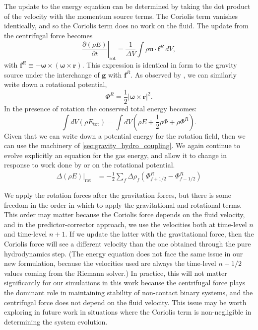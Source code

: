 \documentclass[iop]{../emulateapj}
\begin{document}
The update to the energy equation can be determined by taking the dot product of the velocity
with the momentum source terms. The Coriolis term vanishes identically, and so
the Coriolis term does no work on the fluid. The update from the centrifugal force becomes
\begin{equation}
  \left.\frac{\partial(\rho E)}{\partial t}\right|_{\text{rot}} = \frac{1}{\Delta V}\int \rho \mathbf{u} \cdot \mathbf{f}^R\, dV,
\end{equation}
with $\mathbf{f}^R \equiv  -{\bm\omega} \times \left({\bm\omega} \times \mathbf{r}\right)$. 
This expression is identical in form to the gravity source under the interchange of $\mathbf{g}$ with $\mathbf{f}^R$.
As observed by \cite{marcello:2012}, we can similarly write down a rotational potential,
\begin{equation}
  \Phi^R = \frac{1}{2} \left| {\bm\omega} \times \mathbf{r} \right|^2.
\end{equation}
In the presence of rotation the conserved total energy becomes:
\begin{equation}
  \int dV (\rho E_{\text{tot}}) = \int dV \left( \rho E + \frac{1}{2} \rho \Phi + \rho \Phi^R \right).
\end{equation}
Given that we can write down a potential energy for the rotation field, then we can use the machinery of 
\autoref{sec:gravity_hydro_coupling}. We again continue to evolve explicitly an equation for 
the gas energy, and allow it to change in response to work done by or on the rotational potential.
\begin{align}
  \left.\Delta(\rho E)\right|_{\text{rot}} &= -\frac{1}{2}\sum_{f} \Delta \rho_{f} (\Phi^R_{f+1/2} - \Phi^R_{f-1/2})
\end{align}

We apply the rotation forces after the gravitation forces, but 
there is some freedom in the order in which to apply the gravitational and rotational terms.
This order may matter because the Coriolis force depends on the fluid velocity, and 
in the predictor-corrector approach, we use the velocities both at 
time-level $n$ and time-level $n+1$. If we update the latter with the gravitational force, 
then the Coriolis force will see a different velocity than the one obtained through the 
pure hydrodynamics step. (The energy equation does not face the same issue in our new formulation,
because the velocities used are always the time-level $n+1/2$ values coming from the Riemann solver.)
In practice, this will not matter significantly for our simulations in this work 
because the centrifugal force plays the dominant role in maintaining stability of non-contact 
binary systems, and the centrifugal force does not depend on the fluid velocity.
This issue may be worth exploring in future work in situations where the Coriolis 
term is non-negligible in determining the system evolution.
\end{document}
